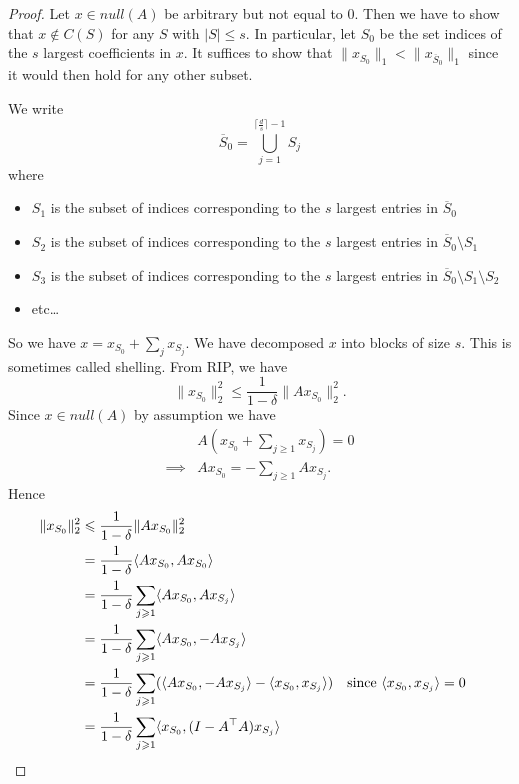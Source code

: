 \begin{proof}
Let $x \in null(A)$ be arbitrary but not equal to $0$. Then we have to show that $x \not\in C(S)$ for any $S$ with $|S| \le s$. In particular, let $S_0$ be the set indices of the $s$ largest coefficients in $x$. It suffices to show that $\|x_{S_0}\|_1 <  \|x_{\overline{S}_0}\|_1$ since it would then hold for any other subset.

We write
\[
\overline{S}_0 = \bigcup\limits_{j = 1}^{\lceil \frac{d}{s} \rceil - 1} S_j
\]
where 
\begin{itemize}
\item $S_1$ is the subset of indices corresponding to the $s$ largest entries in $\overline{S}_0$
\item $S_2$ is the subset of indices corresponding to the $s$ largest entries in $\overline{S}_0\setminus S_1$
\item $S_3$ is the subset of indices corresponding to the $s$ largest entries in $\overline{S}_0\setminus S_1 \setminus S_2$
\item etc\ldots
\end{itemize}
So we have $x = x_{S_0} + \sum\limits_j x_{S_j}$. We have decomposed $x$ into blocks of size $s$. This is sometimes called shelling. From RIP, we have
\[
\|x_{S_0}\|_2^2 \le \frac{1}{1 - \delta}\|Ax_{S_0}\|_2^2.
\]
Since $x \in null(A)$ by assumption we have
\begin{align*}
&A(x_{S_0} + \sum\limits_{j \ge 1} x_{S_j}) = 0\\
\implies&Ax_{S_0} = -\sum\limits_{j \ge 1} Ax_{S_j}.
\end{align*}
Hence
\begin{align*}
\|x_{S_0}\|_2^2 &\le \frac{1}{1 - \delta}\|Ax_{S_0}\|_2^2\\
                &= \frac{1}{1 - \delta}\langle Ax_{S_0}, Ax_{S_0}\rangle\\
                &= \frac{1}{1 - \delta}\sum\limits_{j \ge 1}\langle Ax_{S_0}, Ax_{S_j}\rangle\\
                &= \frac{1}{1 - \delta}\sum\limits_{j \ge 1}\langle Ax_{S_0}, -Ax_{S_j}\rangle\\
                &=  \frac{1}{1 - \delta}\sum\limits_{j \ge 1}(\langle Ax_{S_0}, -Ax_{S_j}\rangle - \langle x_{S_0}, x_{S_j} \rangle) && \text{since $\langle x_{S_0}, x_{S_j} \rangle = 0$}\\                
                &=  \frac{1}{1 - \delta}\sum\limits_{j \ge 1}\langle x_{S_0}, (I - A^{\trans}A)x_{S_j}\rangle\\                

\end{align*}
\end{proof}
